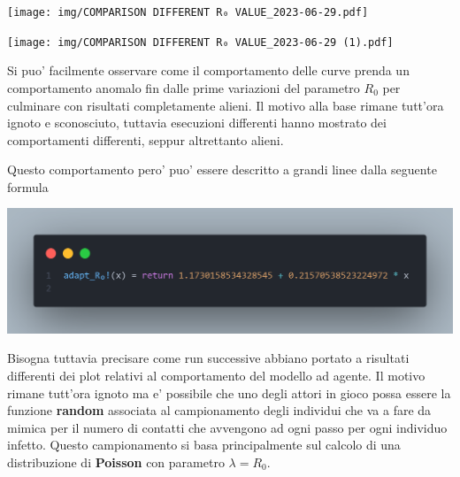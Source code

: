 \begin{minipage}{\linewidth}
    \centering
    \texttt{[image: img/COMPARISON DIFFERENT R₀ VALUE\_2023-06-29.pdf]}
    \label{fig:strange_behaviour_R0_abm}
\end{minipage}

\begin{minipage}{\linewidth}
    \centering
    \texttt{[image: img/COMPARISON DIFFERENT R₀ VALUE\_2023-06-29 (1).pdf]}
    \label{fig:strange_behaviour_R0_ode}
\end{minipage}

Si puo' facilmente osservare come il comportamento delle curve prenda un comportamento 
anomalo fin dalle prime variazioni del parametro $R_0$ per culminare con risultati 
completamente alieni. Il motivo alla base rimane tutt'ora ignoto e sconosciuto, tuttavia
esecuzioni differenti hanno mostrato dei comportamenti differenti, seppur altrettanto 
alieni. 

Questo comportamento pero' puo' essere descritto a grandi linee dalla seguente formula

\begin{minipage}{\linewidth}
    \centering
    \includegraphics[width=\textwidth]{img/rapporto_strano.png}
    \label{fig:strange_behaviour_R0}
\end{minipage}

Bisogna tuttavia precisare come run successive abbiano portato a risultati differenti dei plot 
relativi al comportamento del modello ad agente. Il motivo rimane tutt'ora ignoto ma e' possibile
che uno degli attori in gioco possa essere la funzione \textbf{random} associata al campionamento 
degli individui che va a fare da mimica per il numero di contatti che avvengono ad ogni passo 
per ogni individuo infetto. Questo campionamento si basa principalmente sul calcolo di una 
distribuzione di \textbf{Poisson} \cite{wiki:Distribuzione_di_Poisson} con parametro $\lambda = R_0$.

